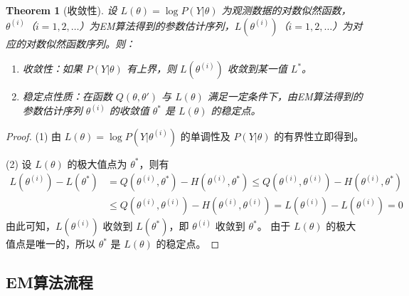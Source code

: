 \documentclass[a4paper,12pt]{ctexart} %
\newtheorem{theorem}{Theorem} %
\begin{document}
\begin{theorem}[收敛性]
设 \( L(\theta) = \log P(Y|\theta) \) 为观测数据的对数似然函数，\( \theta^{(i)} \)（\( i = 1, 2, \dots \)）为EM算法得到的参数估计序列，\( L(\theta^{(i)}) \)（\( i = 1, 2, \dots \)）为对应的对数似然函数序列。则：
\begin{enumerate}
    \item 收敛性：如果 \( P(Y|\theta) \) 有上界，则 \( L(\theta^{(i)}) \) 收敛到某一值 \( L^* \)。
    \item 稳定点性质：在函数 \( Q(\theta, \theta') \) 与 \( L(\theta) \) 满足一定条件下，由EM算法得到的参数估计序列 \( \theta^{(i)} \) 的收敛值 \( \theta^* \) 是 \( L(\theta) \) 的稳定点。
\end{enumerate}
\end{theorem}

\begin{proof}
    (1) 由 $L(\theta) = \log P(Y | \theta^{(i)})$ 的单调性及 $P(Y | \theta)$ 的有界性立即得到。
    
    (2) 设 $L(\theta)$ 的极大值点为 $\theta^*$，则有
    \begin{equation}
    \begin{aligned}
    L(\theta^{(i)}) - L(\theta^*) &= Q(\theta^{(i)}, \theta^*) - H(\theta^{(i)}, \theta^*) 
    \leq Q(\theta^{(i)}, \theta^{(i)}) - H(\theta^{(i)}, \theta^*) \\
    &\leq Q(\theta^{(i)}, \theta^{(i)}) - H(\theta^{(i)}, \theta^{(i)}) 
    = L(\theta^{(i)}) - L(\theta^{(i)}) = 0
    \end{aligned}
    \end{equation}
    由此可知，$L(\theta^{(i)})$ 收敛到 $L(\theta^*)$，即 $\theta^{(i)}$ 收敛到 $\theta^*$。
    由于 $L(\theta)$ 的极大值点是唯一的，所以 $\theta^*$ 是 $L(\theta)$ 的稳定点。

    \end{proof}

\subsection{EM算法流程}
\end{document}
